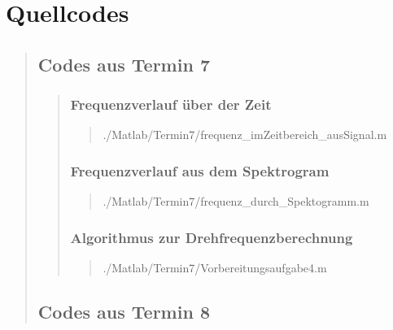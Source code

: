 \section{Quellcodes}
\begin{quote}

    \subsection{Codes aus Termin 7}
    \begin{quote}
        
        \subsubsection{Frequenzverlauf über der Zeit}
        \begin{quote}
            
                {./Matlab/Termin7/frequenz_imZeitbereich_ausSignal.m}
        \end{quote}

        \subsubsection{Frequenzverlauf aus dem Spektrogram}
        \begin{quote}
            
                {./Matlab/Termin7/frequenz_durch_Spektogramm.m}
        \end{quote}

        \subsubsection{Algorithmus zur Drehfrequenzberechnung}
        \begin{quote}
            
                {./Matlab/Termin7/Vorbereitungsaufgabe4.m}
        \end{quote}
        
    \end{quote}%
    
    \subsection{Codes aus Termin 8}
    \begin{quote}
    

\end{quote}
\end{quote}
